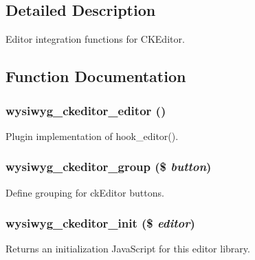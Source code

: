\subsection{Detailed Description}
Editor integration functions for CKEditor. 

\subsection{Function Documentation}
\hypertarget{ckeditor_8inc_a0cb339543d3ff4f4b42081c467fb1afe}{
\subsubsection[{wysiwyg\_\-ckeditor\_\-editor}]{\setlength{\rightskip}{0pt plus 5cm}wysiwyg\_\-ckeditor\_\-editor ()}}
\label{ckeditor_8inc_a0cb339543d3ff4f4b42081c467fb1afe}
Plugin implementation of hook\_\-editor(). \hypertarget{ckeditor_8inc_a9fc28d9baa8e7c55221045b2b554eabf}{
\subsubsection[{wysiwyg\_\-ckeditor\_\-group}]{\setlength{\rightskip}{0pt plus 5cm}wysiwyg\_\-ckeditor\_\-group (\$ {\em button})}}
\label{ckeditor_8inc_a9fc28d9baa8e7c55221045b2b554eabf}
Define grouping for ckEditor buttons. \hypertarget{ckeditor_8inc_af59c8327a34782dc05851481f5b28008}{
\subsubsection[{wysiwyg\_\-ckeditor\_\-init}]{\setlength{\rightskip}{0pt plus 5cm}wysiwyg\_\-ckeditor\_\-init (\$ {\em editor})}}
\label{ckeditor_8inc_af59c8327a34782dc05851481f5b28008}
Returns an initialization JavaScript for this editor library.


